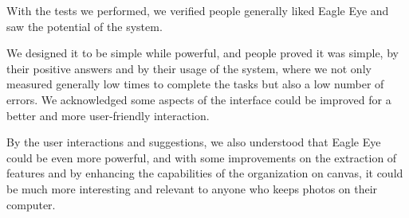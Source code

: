 With the tests we performed, we verified people generally liked Eagle Eye and saw the potential of the system.

We designed it to be simple while powerful, and people proved it was simple, by their positive answers and by their usage of the system, where we not only measured generally low times to complete the tasks but also a low number of errors. We acknowledged some aspects of the interface could be improved for a better and more user-friendly interaction.

By the user interactions and suggestions, we also understood that Eagle Eye could be even more powerful, and with some improvements on the extraction of features and by enhancing the capabilities of the organization on canvas, it could be much more interesting and relevant to anyone who keeps photos on their computer.
